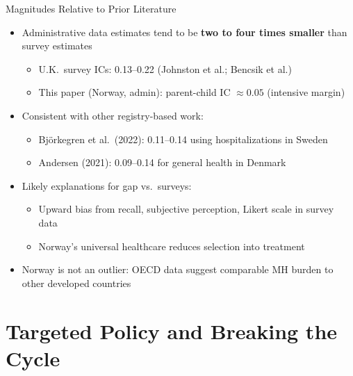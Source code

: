 \documentclass[aspectratio=169]{beamer}
\begin{document}
\begin{frame}{Magnitudes Relative to Prior Literature}
  \begin{itemize}
    \item Administrative data estimates tend to be \textbf{two to four times smaller} than survey estimates
    \begin{itemize}
      \item U.K.\ survey ICs: 0.13--0.22 (Johnston et al.; Bencsik et al.)
      \item This paper (Norway, admin): parent-child IC $\approx 0.05$ (intensive margin)
    \end{itemize}
    \item Consistent with other registry-based work:
    \begin{itemize}
      \item Bj\"{o}rkegren et al.\ (2022): 0.11--0.14 using hospitalizations in Sweden
      \item Andersen (2021): 0.09--0.14 for general health in Denmark
    \end{itemize}
    \item Likely explanations for gap vs.\ surveys:
    \begin{itemize}
      \item Upward bias from recall, subjective perception, Likert scale in survey data
      \item Norway's universal healthcare reduces selection into treatment
    \end{itemize}
    \item Norway is not an outlier: OECD data suggest comparable MH burden to other developed countries
  \end{itemize}
\end{frame}

\section{Targeted Policy and Breaking the Cycle}
\end{document}
